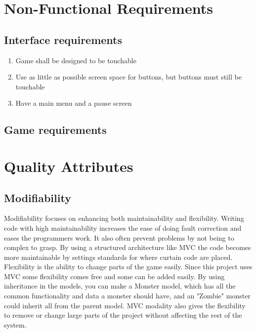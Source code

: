 	\section{Non-Functional Requirements}
		\subsection{Interface requirements}
		\begin{enumerate}
			\item Game shall be designed to be touchable
			\item Use as little as possible screen space for buttons, but buttons must still be touchable
			\item Have a main menu and a pause screen
		\end{enumerate}

		\subsection{Game requirements}

	\section{Quality Attributes}
		\subsection{Modifiability}
			Modifiability focuses on enhancing both maintainability and flexibility. Writing code with high maintainability increases the ease of doing fault correction and eases the programmers work. It also often prevent problems by not being to complex to grasp.
			By using a structured architecture like MVC the code becomes more maintainable by settings standards for where curtain code are placed.
			Flexibility is the ability to change parts of the game easily. Since this project uses MVC some flexibility comes free and some can be added easily.
			By using inheritance in the models, you can make a Monster model, which has all the common functionality and data a monster should have, and an "Zombie" monster could inherit all from the parent model.
			MVC modality also gives the flexibility to remove or change large parts of the project without affecting the rest of the system.

